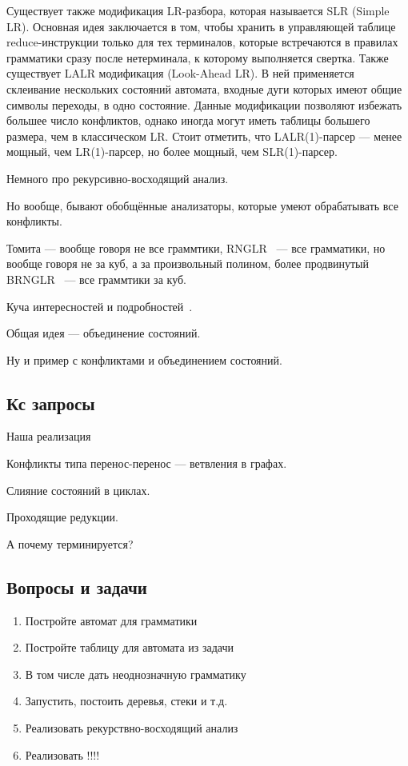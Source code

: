 Существует также модификация LR-разбора, которая называется SLR (Simple LR). 
Основная идея заключается в том, чтобы хранить в управляющей таблице reduce-инструкции только для тех терминалов, которые встречаются в правилах грамматики сразу после нетерминала, к которому выполняется свертка. 
Также существует LALR модификация (Look-Ahead LR).
В ней применяется склеивание нескольких состояний автомата, входные дуги которых имеют общие символы переходы, в одно состояние.
Данные модификации позволяют избежать большее число конфликтов, однако иногда могут иметь таблицы большего размера, чем в классическом LR.
Стоит отметить, что LALR(1)-парсер --- менее мощный, чем LR(1)-парсер, но более мощный, чем SLR(1)-парсер.

Немного про рекурсивно-восходящий анализ.

Но вообще, бывают обобщённые анализаторы, которые умеют обрабатывать все конфликты.

Томита --- вообще говоря не все граммтики, RNGLR~\cite{Scott:2006:RNG:1146809.1146810} --- все грамматики, но вообще говоря не за куб, а за произвольный полином, более продвинутый BRNGLR~\cite{!!!} --- все граммтики за куб.

Куча интересностей и подробностей~\cite{DBLP:phd/ethos/Economopoulos06}.

Общая идея --- объединение состояний. 

\begin{example}
Ну и пример с конфликтами и объединением состояний.
\end{example}


\subsection{Кс запросы}


Наша реализация~\cite{10.1007/978-3-319-41579-6_22}

Конфликты типа перенос-перенос --- ветвления в графах.

Слияние состояний в циклах.

Проходящие редукции.

А почему терминируется?


\subsection{Вопросы и задачи}
\begin{enumerate}
\item Постройте автомат для грамматики
\item Постройте таблицу для автомата из задачи
\item В том числе дать неоднозначную грамматику
\item Запустить, постоить деревья, стеки и т.д.
\item Реализовать рекурствно-восходящий анализ
\item Реализовать !!!!
\end{enumerate}
